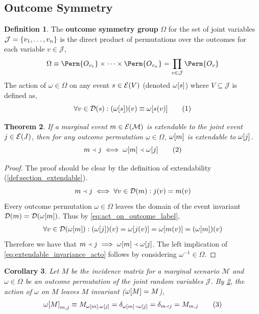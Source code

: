\documentclass[aps, 10pt, english, twoside, pra, nofootinbib, longbibliography]{revtex4-1}
\theoremstyle{plain}
\newtheorem{theorem}{Theorem}
\newtheorem{corollary}[theorem]{Corollary}
\theoremstyle{definition}
\newtheorem{definition}[theorem]{Definition}
\theoremstyle{remark}
\newcommand{\ext}{\mathrel{\Yleft}}
\newcommand{\geo}{\omega}
\newcommand{\go}{\Omega}
\newcommand{\mscenario}{\mathcal{M}}
\newcommand{\jointvar}{\mathcal{J}}
\newcommand{\term}[1]{\textcolor{Mahogany}{\textbf{#1}}}
\newcommand{\Events}[1]{\s{E}\br{#1}} %
\newcommand{\Dom}[1]{\s{D}\br{#1}} %
\begin{document}
    \subsection{Outcome Symmetry}
    \label{sec:outome_label_symmetry}
    \begin{definition}
        The \term{outcome symmetry group} $\go$ for the set of joint variables $\jointvar = \bc{v_1, \ldots, v_n}$ is the direct product of permutations over the outcomes for each variable $v \in \jointvar$,
        \[ \go \defined \Perm{O_{v_1}} \times \cdots \times \Perm{O_{v_n}} = \prod_{v \in \jointvar} \Perm{O_{v}} \]
        The action of $\geo \in \go$ on any event $s \in \Events{V}$ (denoted $\geo\bs{s}$) where $V \subseteq \jointvar$ is defined as,
        \[ \forall v \in \Dom{s} : \br{\geo\bs{s}}\br{v} \defined \geo\bs{s\br{v}} \eq \label{eq:act_on_outcome_label}\]
    \end{definition}
    \begin{theorem}
        \label{thm:extendable_invariance_acto}
        If a marginal event $m \in \Events{\mscenario}$ is extendable to the joint event $j \in \Events{J}$, then for any outcome permutation $\geo \in \go$, $\geo\bs{m}$ is extendable to $\geo\bs{j}$.
        \[ m \ext j \iff \geo\bs{m} \ext \geo\bs{j} \eq \label{eq:extendable_invariance_acto}\]
    \end{theorem}
    \begin{proof}
        The proof should be clear by the definition of extendability (\cref{def:section_extendable}).
        \[ m \ext j \iff \forall v \in \Dom{m} : j\br{v} = m\br{v} \]
        Every outcome permutation $\geo \in \go$ leaves the domain of the event invariant $\Dom{m} = \Dom{\geo\bs{m}}$. Thus by \cref{eq:act_on_outcome_label},
        \begin{align*}
        \forall v \in \Dom{\geo\bs{m}}: \br{\geo\bs{j}}\br{v} = \geo\bs{j\br{v}} = \geo\bs{m\br{v}} = \br{\geo\bs{m}}\br{v}
        \end{align*}
        Therefore we have that $m \ext j \implies \geo\bs{m} \ext \geo\bs{j}$. The left implication of \cref{eq:extendable_invariance_acto} follows by considering $\geo^{-1} \in \go$.
    \end{proof}
    \begin{corollary}
        \label{coll:incidence_invariance}
        Let $M$ be the incidence matrix for a marginal scenario $\mscenario$ and $\geo \in \go$ be an outcome permutation of the joint random variables $\jointvar$. By \cref{thm:extendable_invariance_acto}, the action of $\geo$ on $M$ leaves $M$ invariant ($\geo\bs{M} = M$),
        \[ \geo\bs{M}_{m,j} \defined M_{\geo\bs{m},\geo\bs{j}} = \de_{\geo\bs{m} \ext \geo\bs{j}} = \de_{m \ext j} = M_{m,j} \eq \label{eq:incidence_invariance}\]
    \end{corollary}
\end{document}
